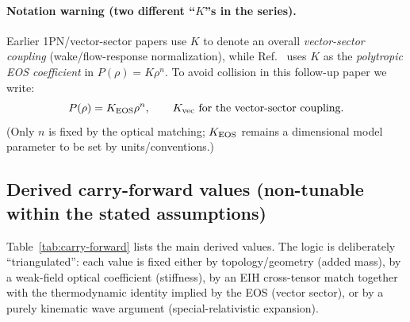 \documentclass[11pt]{article}
\begin{document}
\paragraph{Notation warning (two different ``\(K\)''s in the series).}
Earlier 1PN/vector-sector papers use \(K\) to denote an overall \emph{vector-sector coupling} (wake/flow-response normalization), while Ref.~\cite{norris2026_4d_model} uses \(K\) as the \emph{polytropic EOS coefficient} in \(P(\rho)=K\rho^n\). To avoid collision in this follow-up paper we write:
\[
P(\rho)=K_{\rm EOS}\rho^n,
\qquad
K_{\rm vec}\ \text{for the vector-sector coupling.}
\]
(Only \(n\) is fixed by the optical matching; \(K_{\rm EOS}\) remains a dimensional model parameter to be set by units/conventions.)

\subsection{Derived carry-forward values (non-tunable within the stated assumptions)}
Table~\ref{tab:carry-forward} lists the main derived values. The logic is deliberately ``triangulated'': each value is fixed either by topology/geometry (added mass), by a weak-field optical coefficient (stiffness), by an EIH cross-tensor match together with the thermodynamic identity implied by the EOS (vector sector), or by a purely kinematic wave argument (special-relativistic expansion).
\end{document}
